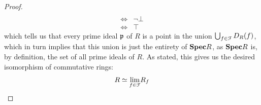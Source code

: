 \begin{proof}
$$\begin{aligned}
                                        \\
                                        \iff & \neg \bot
                                        \\
                                        \iff & \top
                                    \end{aligned}
                                $$
                            which tells us that every prime ideal $\mathfrak{p}$ of $R$ is a point in the union $\bigcup_{f \in \mathcal{F}} D_R(f)$, which in turn implies that this union is just the entirety of $\mathbf{Spec} R$, as $\mathbf{Spec} R$ is, by definition, the set of all prime ideals of $R$. As stated, this gives us the desired isomorphism of commutative rings:
                                $$R \simeq \underset{f \in \mathcal{F}}{\operatorname{lim}} R_f$$
                        \end{proof}
                        

